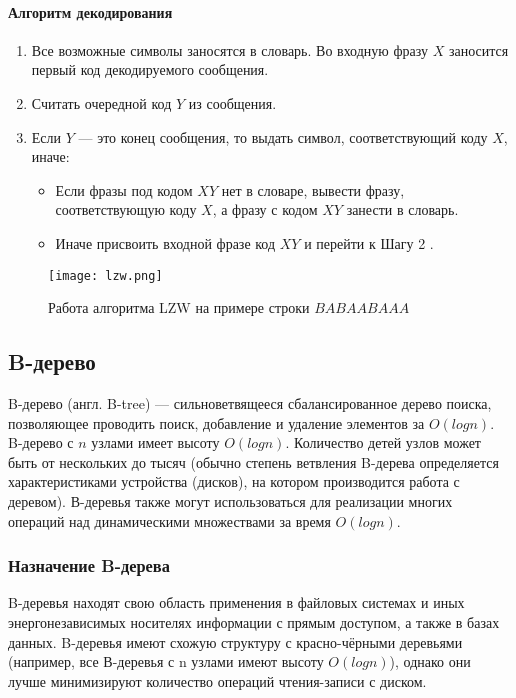 \documentclass[14pt, russian]{scrartcl}
\begin{document}
\paragraph* {Алгоритм декодирования}

\begin{enumerate}
\item Все возможные символы заносятся в словарь. Во входную фразу $X$ заносится первый код декодируемого сообщения.
\item Считать очередной код $Y$ из сообщения.
\item Если $Y$ — это конец сообщения, то выдать символ, соответствующий коду $X$, иначе: 
    \begin{itemize}
    \item Если фразы под кодом $XY$ нет в словаре, вывести фразу, соответствующую коду $X$, а фразу с кодом $XY$ занести в словарь. 
    \item Иначе присвоить входной фразе код $XY$ и перейти к Шагу 2 .
    \end{itemize}
\end{enumerate}

\vspace{20pt}
\begin{figure}[!htb]\centering
\texttt{[image: lzw.png]}
\caption{Работа алгоритма LZW на примере строки $BABAABAAA$}
\label{fig::thesis}
\end{figure}

\subsection{B-дерево}
B-дерево (англ. B-tree) — сильноветвящееся сбалансированное дерево поиска, позволяющее проводить поиск, добавление и удаление элементов за $O(log n)$. B-дерево с $n$ узлами имеет высоту $O(log n)$. Количество детей узлов может быть от нескольких до тысяч (обычно степень ветвления B-дерева определяется характеристиками устройства (дисков), на котором производится работа с деревом). В-деревья также могут использоваться для реализации многих операций над динамическими множествами за время $O(log n)$.

\subsubsection{Назначение B-дерева}
B-деревья находят свою область применения в файловых системах и иных энергонезависимых носителях информации с прямым доступом, а также в базах данных. B-деревья имеют схожую структуру с красно-чёрными деревьями (например, все В-деревья с n узлами имеют высоту $O(logn)$), однако они лучше минимизируют количество операций чтения-записи с диском. 
\end{document}
